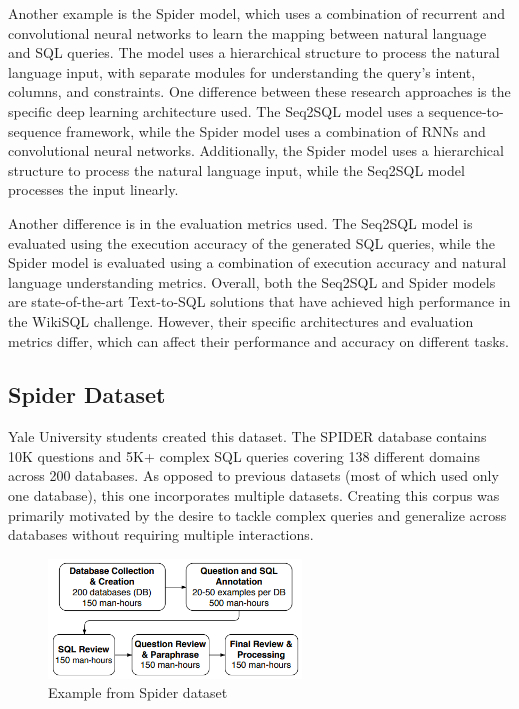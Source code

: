 Another example is the Spider model, which uses a combination of recurrent and convolutional neural networks to learn the mapping between natural language and SQL queries. The model uses a hierarchical structure to process the natural language input, with separate modules for understanding the query's intent, columns, and constraints.
One difference between these research approaches is the specific deep learning architecture used. The Seq2SQL model uses a sequence-to-sequence framework, while the Spider model uses a combination of RNNs and convolutional neural networks. Additionally, the Spider model uses a hierarchical structure to process the natural language input, while the Seq2SQL model processes the input linearly.

Another difference is in the evaluation metrics used. The Seq2SQL model is evaluated using the execution accuracy of the generated SQL queries, while the Spider model is evaluated using a combination of execution accuracy and natural language understanding metrics.
Overall, both the Seq2SQL and Spider models are state-of-the-art Text-to-SQL solutions that have achieved high performance in the WikiSQL challenge. However, their specific architectures and evaluation metrics differ, which can affect their performance and accuracy on different tasks.

\subsection{Spider Dataset}

Yale University students created this dataset.
The SPIDER database contains 10K questions and 5K+ complex SQL queries covering 138 different domains across 200 databases. As opposed to previous datasets (most of which used only one database), this one incorporates multiple datasets. Creating this corpus was primarily motivated by the desire to tackle complex queries and generalize across databases without requiring multiple interactions.

\begin{figure}[htb]
    \centering
    \includegraphics[width=0.6\textwidth]{pics/db/Spider.png}
    \caption{Example from Spider dataset\cite{yu_spider_2019}}
    \label{fig:Spider}
\end{figure}

